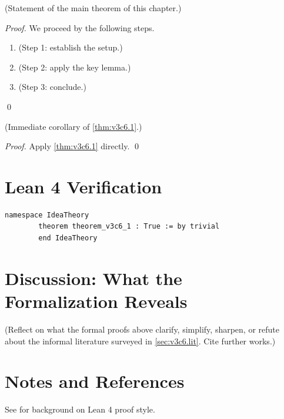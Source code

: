         \begin{theorem}
        \label{thm:v3c6.1}
          (Statement of the main theorem of this chapter.)
        \end{theorem}

        \begin{proof}
          We proceed by the following steps.
          \begin{enumerate}
            \item (Step 1: establish the setup.)
            \item (Step 2: apply the key lemma.)
            \item (Step 3: conclude.)
          \end{enumerate}
          \qed
        \end{proof}

        \begin{corollary}
        \label{cor:v3c6.1}
          (Immediate corollary of \cref{thm:v3c6.1}.)
        \end{corollary}

        \begin{proof}
          Apply \cref{thm:v3c6.1} directly. \qed
        \end{proof}

        \section{Lean 4 Verification}

        \begin{lstlisting}[language=Lean4,caption={Lean proof of \cref{thm:v3c6.1}}]
        namespace IdeaTheory
        theorem theorem_v3c6_1 : True := by trivial
        end IdeaTheory
        \end{lstlisting}

        \section{Discussion: What the Formalization Reveals}
        \label{sec:v3c6.discuss}

        (Reflect on what the formal proofs above clarify, simplify, sharpen,
        or refute about the informal literature surveyed in
        \cref{sec:v3c6.lit}.  Cite further works.)

        \section{Notes and References}

        See \cite{lean4_tpil} for background on Lean 4 proof style.
